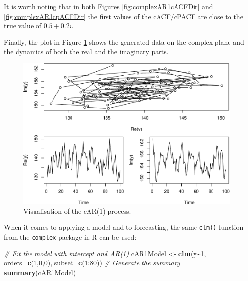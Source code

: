 \documentclass[
]{book}
\newenvironment{Shaded}{\begin{snugshade}}{\end{snugshade}}
\newcommand{\CommentTok}[1]{\textcolor[rgb]{0.56,0.35,0.01}{\textit{#1}}}
\newcommand{\DataTypeTok}[1]{\textcolor[rgb]{0.13,0.29,0.53}{#1}}
\newcommand{\DecValTok}[1]{\textcolor[rgb]{0.00,0.00,0.81}{#1}}
\newcommand{\KeywordTok}[1]{\textcolor[rgb]{0.13,0.29,0.53}{\textbf{#1}}}
\newcommand{\NormalTok}[1]{#1}
\newcommand{\OperatorTok}[1]{\textcolor[rgb]{0.81,0.36,0.00}{\textbf{#1}}}
\newcommand{\StringTok}[1]{\textcolor[rgb]{0.31,0.60,0.02}{#1}}
\begin{document}
It is worth noting that in both Figures \ref{fig:complexAR1cACFDir} and \ref{fig:complexAR1cpACFDir} the first values of the cACF/cPACF are close to the true value of \(0.5+0.2i\).

Finally, the plot in Figure \ref{fig:complexAR1Plot} shows the generated data on the complex plane and the dynamics of both the real and the imaginary parts.

\begin{figure}
\centering
\includegraphics{Svetunkov---Svetunkov---Complex-Valued-Econometrics_files/figure-latex/complexAR1Plot-1.pdf}
\caption{\label{fig:complexAR1Plot}Visualisation of the cAR(1) process.}
\end{figure}

When it comes to applying a model and to forecasting, the same \texttt{clm()} function from the \texttt{complex} package in R can be used:

\begin{Shaded}
\begin{Highlighting}[]
\CommentTok{\# Fit the model with intercept and AR(1)}
\NormalTok{cAR1Model \textless{}{-}}\StringTok{ }\KeywordTok{clm}\NormalTok{(y}\OperatorTok{\textasciitilde{}}\DecValTok{1}\NormalTok{, }\DataTypeTok{orders=}\KeywordTok{c}\NormalTok{(}\DecValTok{1}\NormalTok{,}\DecValTok{0}\NormalTok{,}\DecValTok{0}\NormalTok{), }\DataTypeTok{subset=}\KeywordTok{c}\NormalTok{(}\DecValTok{1}\OperatorTok{:}\DecValTok{80}\NormalTok{))}
\CommentTok{\# Generate the summary}
\KeywordTok{summary}\NormalTok{(cAR1Model)}
\end{Highlighting}
\end{Shaded}
\end{document}

